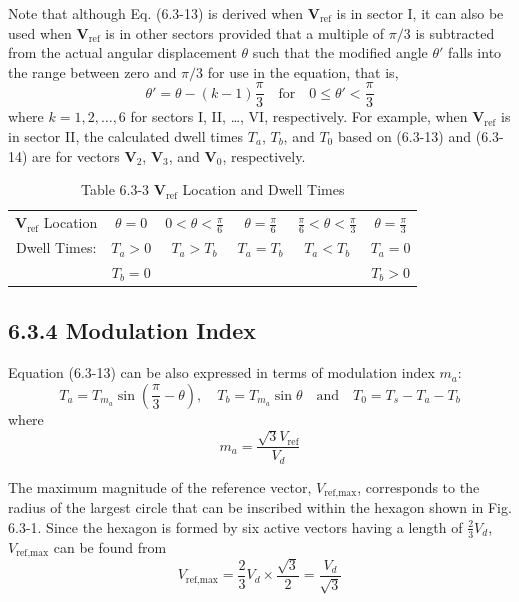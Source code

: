 \documentclass[letterpaper,12pt]{article}
\begin{document}
Note that although Eq. (6.3-13) is derived when \( \mathbf{V}_{\text{ref}} \) is in sector I, it can also be used when \( \mathbf{V}_{\text{ref}} \) is in other sectors provided that a multiple of \( \pi/3 \) is subtracted from the actual angular displacement \(\theta\) such that the modified angle \(\theta'\) falls into the range between zero and \( \pi/3 \) for use in the equation, that is,
\[
\theta' = \theta - (k-1)\frac{\pi}{3} \quad \text{for} \quad 0 \leq \theta' < \frac{\pi}{3} \tag{6.3-14}
\]
where \( k = 1, 2, \ldots, 6 \) for sectors I, II, \ldots, VI, respectively. For example, when \( \mathbf{V}_{\text{ref}} \) is in sector II, the calculated dwell times \( T_a \), \( T_b \), and \( T_0 \) based on (6.3-13) and (6.3-14) are for vectors \( \mathbf{V}_2 \), \( \mathbf{V}_3 \), and \( \mathbf{V}_0 \), respectively.

\begin{table}[h]
\centering
\caption{Table 6.3-3 $\mathbf{V}_{\text{ref}}$ Location and Dwell Times}
\begin{tabular}{c c c c c c}
\hline
$\mathbf{V}_{\text{ref}}$ Location & $\theta = 0$ & $0 < \theta < \frac{\pi}{6}$ & $\theta = \frac{\pi}{6}$ & $\frac{\pi}{6} < \theta < \frac{\pi}{3}$ & $\theta = \frac{\pi}{3}$ \\ [1em]
Dwell Times: & $T_a > 0$ & $T_a > T_b$ & $T_a = T_b$ & $T_a < T_b$ & $T_a = 0$ \\
& $T_b = 0$ & & & & $T_b > 0$ \\
\hline
\end{tabular}
\end{table}
\FloatBarrier

\subsection*{6.3.4 Modulation Index}

Equation (6.3-13) can be also expressed in terms of modulation index \( m_a \):
\[
T_a = T_{m_a} \sin\left(\frac{\pi}{3} - \theta\right), \quad T_b = T_{m_a} \sin \theta \quad \text{and} \quad T_0 = T_s - T_a - T_b \tag{6.3-15}
\]
where
\[
m_a = \frac{\sqrt{3} V_{\text{ref}}}{V_d} \tag{6.3-16}
\]

The maximum magnitude of the reference vector, \( V_{\text{ref},\text{max}} \), corresponds to the radius of the largest circle that can be inscribed within the hexagon shown in Fig. 6.3-1. Since the hexagon is formed by six active vectors having a length of \( \frac{2}{3} V_d \), \( V_{\text{ref},\text{max}} \) can be found from
\[
V_{\text{ref},\text{max}} = \frac{2}{3} V_d \times \frac{\sqrt{3}}{2} = \frac{V_d}{\sqrt{3}} \tag{6.3-17}
\]
\end{document}
